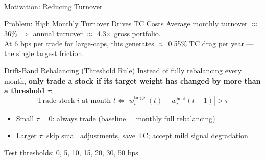 \documentclass[
  ignorenonframetext,
  aspectratio=169]{beamer}
\begin{document}
\begin{frame}{Motivation: Reducing Turnover}
\label{motivation-reducing-turnover}
\begin{block}{Problem: High Monthly Turnover Drives TC Costs}
Average monthly turnover $\approx$ 36\% $\Rightarrow$ annual turnover $\approx$ 4.3$\times$ gross portfolio.\\
At 6 bps per trade for large-caps, this generates $\approx$ 0.55\% TC drag per year --- the single largest friction.
\end{block}
\bigskip
\begin{block}{Drift-Band Rebalancing (Threshold Rule)}
Instead of fully rebalancing every month, \textbf{only trade a stock if its target weight has changed by more than a threshold $\tau$}:
$$\text{Trade stock } i \text{ at month } t \iff |w_i^{\text{target}}(t) - w_i^{\text{held}}(t-1)| > \tau$$
\begin{itemize}
\item Small $\tau = 0$: always trade (baseline = monthly full rebalancing)
\item Larger $\tau$: skip small adjustments, save TC; accept mild signal degradation
\end{itemize}
\end{block}
\begin{alertblock}{Test thresholds: 0, 5, 10, 15, 20, 30, 50 bps}
\end{alertblock}
\end{frame}
\end{document}

